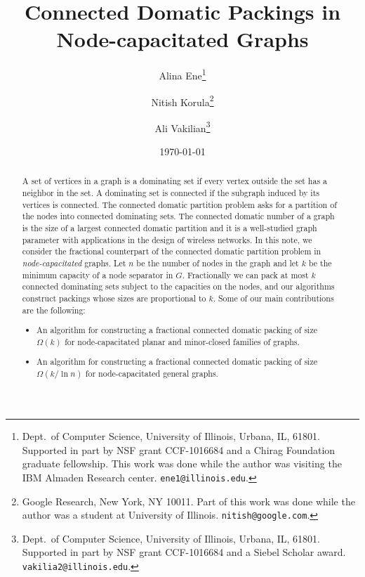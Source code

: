 \documentclass[11pt]{article}
\begin{document}
\title{Connected Domatic Packings in Node-capacitated Graphs}
\author{
Alina Ene\thanks{Dept.\ of Computer Science, University of Illinois,
Urbana, IL, 61801. Supported in part by NSF grant CCF-1016684 and a
Chirag Foundation graduate fellowship. This work was done while the
author was visiting the IBM Almaden Research center.
{\tt ene1@illinois.edu}.}
\and
Nitish Korula\thanks{
Google Research, New York, NY 10011. Part of this work was done while
the author was a student at University of Illinois.
{\tt nitish@google.com}.}
\and
Ali Vakilian\thanks{
Dept.\ of Computer Science, University of Illinois, Urbana, IL,
61801. Supported in part by NSF grant CCF-1016684 and a Siebel Scholar award. 
{\tt vakilia2@illinois.edu}.}}

\date{\today}

\maketitle

\begin{abstract}
	A set of vertices in a graph is a dominating set if every vertex
	outside the set has a neighbor in the set. A dominating set is
	connected if the subgraph induced by its vertices is connected.
	The connected domatic partition problem asks for a partition of
	the nodes into connected dominating sets. The connected domatic
	number of a graph is the size of a largest connected domatic
	partition and it is a well-studied graph parameter with
	applications in the design of wireless networks.
In this note, we consider the fractional counterpart of the
	connected domatic partition problem in \emph{node-capacitated}
	graphs. Let $n$ be the number of nodes in the graph and let $k$
	be the minimum capacity of a node separator in $G$. Fractionally
	we can pack at most $k$ connected dominating sets subject to the
	capacities on the nodes, and our algorithms construct packings
	whose sizes are proportional to $k$. Some of our main
	contributions are the following:
\begin{itemize}
		\item An algorithm for constructing a fractional connected
		domatic packing of size $\Omega\left(k \right)$ for
		node-capacitated planar and minor-closed families of graphs.
\item An algorithm for constructing a fractional connected
		domatic packing of size $\Omega\left(k / \ln{n} \right)$ for
		node-capacitated general graphs.
\end{itemize}
\end{abstract}
\end{document}
